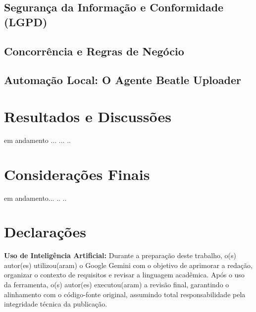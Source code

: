 \documentclass[12pt]{article}
\begin{document}
\subsection{Segurança da Informação e Conformidade (LGPD)}
\subsection{Concorrência e Regras de Negócio}
\subsection{Automação Local: O Agente Beatle Uploader}


\section{Resultados e Discussões}

em andamento ...
...
..

\section{Considerações Finais}
em andamento...
..
..

\section*{Declarações}

\textbf{Uso de Inteligência Artificial:} Durante a preparação deste trabalho, o(s) autor(es) utilizou(aram) o Google Gemini com o objetivo de aprimorar a redação, organizar o contexto de requisitos e revisar a linguagem acadêmica. Após o uso da ferramenta, o(s) autor(es) executou(aram) a revisão final, garantindo o alinhamento com o código-fonte original, assumindo total responsabilidade pela integridade técnica da publicação.
\end{document}

